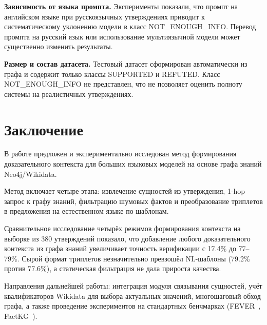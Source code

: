\documentclass{misisarticle}
\begin{document}
\textbf{Зависимость от языка промпта.}
Эксперименты показали, что промпт на английском языке
при русскоязычных утверждениях приводит к систематическому
уклонению модели в класс NOT\_ENOUGH\_INFO.
Перевод промпта на русский язык или использование
мультиязычной модели может существенно изменить результаты.

\textbf{Размер и состав датасета.}
Тестовый датасет сформирован автоматически из графа
и содержит только классы SUPPORTED и REFUTED.
Класс NOT\_ENOUGH\_INFO не представлен,
что не позволяет оценить полноту системы
на реалистичных утверждениях.

\section{Заключение}

В работе предложен и экспериментально исследован метод
формирования доказательного контекста для больших
языковых моделей на основе графа знаний Neo4j/Wikidata.

Метод включает четыре этапа: извлечение сущностей
из утверждения, 1-hop запрос к графу знаний,
фильтрацию шумовых фактов и преобразование триплетов
в предложения на естественном языке по шаблонам.

Сравнительное исследование четырёх режимов
формирования контекста на выборке из 380 утверждений
показало, что добавление любого доказательного контекста
из графа знаний увеличивает точность верификации
с 17.4\% до 77--79\%.
Сырой формат триплетов незначительно превзошёл
NL-шаблоны (79.2\% против 77.6\%),
а статическая фильтрация не дала прироста качества.

Направления дальнейшей работы:
интеграция модуля связывания сущностей,
учёт квалификаторов Wikidata для выбора актуальных значений,
многошаговый обход графа,
а также проведение экспериментов на стандартных
бенчмарках (FEVER~\cite{thorne2018fever},
FactKG~\cite{kim2023factkg}).
\end{document}

